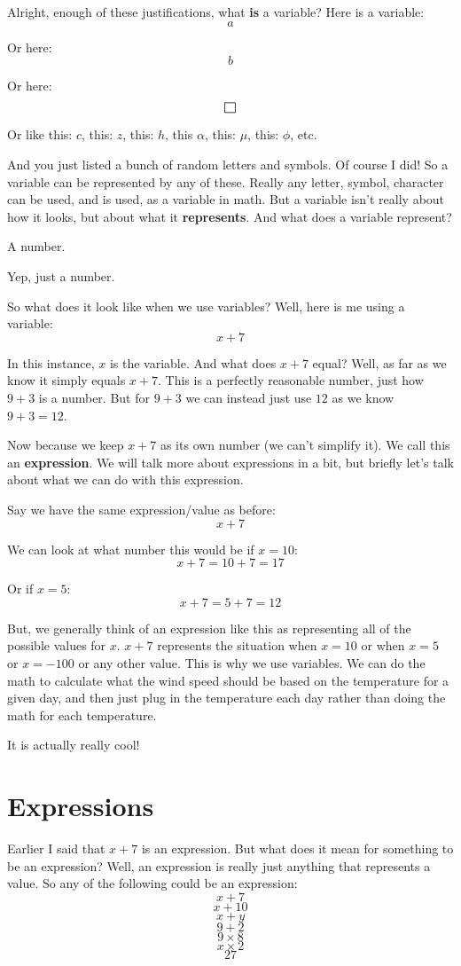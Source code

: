 \documentclass{article}
\def\msquare{\mathord{\scalerel*{\Box}{gX}}}
\begin{document}
Alright, enough of these justifications, what \textbf{is} a variable? Here is a variable:
\[  a \]

Or here:
\[ b \]

Or here: 
\[ \msquare \]

Or like this: $c$, this: $z$, this: $h$, this $\alpha$, this: $\mu$, this: $\phi$, etc. 

And you just listed a bunch of random letters and symbols. Of course I did! So a variable can be represented by any of these. Really any letter, symbol, character can be used, and is used, as a variable in math. 
But a variable isn't really about how it looks, but about what it \textbf{represents}. And what does a variable represent? 
\begin{center}
    A number. 
\end{center}

Yep, just a number. 

So what does it look like when we use variables? Well, here is me using a variable: 
\[ x + 7 \]

In this instance, $x$ is the variable. And what does $x+7$ equal? Well, as far as we know it simply equals $x+7$. This is a perfectly reasonable number, just how $9+3$ is a number. But for $9+3$ we can instead just use $12$ as we know $9+3=12$. 

Now because we keep $x+7$ as its own number (we can't simplify it). We call this an \textbf{expression}. We will talk more about expressions in a bit, but briefly let's talk about what we can do with this expression. 

Say we have the same expression/value as before: 
\[ x+7 \]

We can look at what number this would be if $x=10$: 
\[ x + 7 = 10 + 7 = 17 \]

Or if $x=5$:
\[ x + 7 = 5 + 7 = 12 \]

But, we generally think of an expression like this as representing all of the possible values for $x$. $x+7$ represents the situation when $x=10$ or when $x=5$ or $x=-100$ or any other value. This is why we use variables. We can do the math to calculate what the wind speed should be based on the temperature for a given day, and then just plug in the temperature each day rather than doing the math for each temperature. 

It is actually really cool! 

\section*{Expressions}
Earlier I said that $x+7$ is an expression. But what does it mean for something to be an expression? Well, an expression is really just anything that represents a value. So any of the following could be an expression: 
\[ x+7 \]
\[ x + 10 \]
\[ x + y \]
\[ 9 + 2 \]
\[ 9 \times 8 \]
\[ x \times 2 \] 
\[ 27 \]
\end{document}
